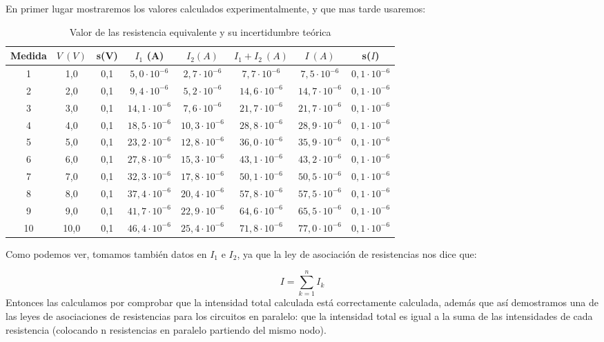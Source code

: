 \documentclass[10pt,a4paper]{article}
\begin{document}
En primer lugar mostraremos los valores calculados experimentalmente, y que mas tarde usaremos:
\begin{table}[h] %
\begin{center}
\begin{tabular}{| c | c | c | c | c | c | c | c |}
\hline
Medida & $V \ (V)$ & s(V) & $I_1 $ (A) & $I_2 (A)$ & $I_1 + I_2 \ (A)$ & $ I \ (A)$ & s($I$) \\ \hline
1 & 1,0 & 0,1 & $5,0 \cdot 10^{-6}$ & $2,7 \cdot 10^{-6}$ & $ 7,7 \cdot 10^{-6}$ & $7,5 \cdot 10^{-6} $
& $0,1\cdot 10^{-6}$\\
2 & 2,0 & 0,1 & $9,4 \cdot 10^{-6}$ & $5,2 \cdot 10^{-6}$ & $ 14,6\cdot 10^{-6}$ & $ 14,7 \cdot 10^{-6} $ & 0$,1\cdot 10^{-6}$\\
3 & 3,0 & 0,1 & $14,1 \cdot 10^{-6}$ & $7,6 \cdot 10^{-6}$ & $ 21,7 \cdot 10^{-6}$ & $21,7 \cdot 10^{-6}$ & $0,1 \cdot 10^{-6}$\\
4 & 4,0 & 0,1 & $18,5 \cdot 10^{-6}$ & $10,3 \cdot 10^{-6}$ & $ 28,8 \cdot 10^{-6}$ & $28,9\cdot 10^{-6}$ & $0,1\cdot 10^{-6}$\\
5 & 5,0 & 0,1 & $23,2 \cdot 10^{-6}$ & $12,8 \cdot 10^{-6}$ & $ 36,0 \cdot 10^{-6}$ & $35,9\cdot 10^{-6}$ & $0,1\cdot 10^{-6}$\\
6 & 6,0 & 0,1 & $27,8 \cdot 10^{-6}$ & $15,3 \cdot 10^{-6}$ & $ 43,1 \cdot 10^{-6}$ & $43,2\cdot 10^{-6}$ & $0,1\cdot 10^{-6}$\\
7 & 7,0 & 0,1 & $32,3 \cdot 10^{-6}$ & $17,8 \cdot 10^{-6}$ & $ 50,1 \cdot 10^{-6}$ & $50,5\cdot 10^{-6}$ & $0,1\cdot 10^{-6}$\\
8 & 8,0 & 0,1 & $37,4 \cdot 10^{-6}$ & $20,4 \cdot 10^{-6}$ & $ 57,8 \cdot 10^{-6} $ & $57,5\cdot 10^{-6}$ & $0,1\cdot 10^{-6}$\\
9 & 9,0 & 0,1 & $41,7 \cdot 10^{-6}$ & $22,9 \cdot 10^{-6}$ & $ 64,6 \cdot 10^{-6}$ & $65,5\cdot 10^{-6}$ & $0,1\cdot 10^{-6}$\\
10 & 10,0 & 0,1 & $46,4 \cdot 10^{-6}$ & $25,4\cdot 10^{-6}$ & $ 71,8 \cdot 10^{-6}$ & $77,0\cdot 10^{-6}$ & $0,1\cdot 10^{-6}$\\ \hline
\end{tabular}
\caption{ Valor de las resistencia equivalente y su incertidumbre teórica}
\end{center}
\end{table}
\begin{flushleft}
Como podemos ver, tomamos también datos en $I_1$ e $I_2$, ya que la ley de asociación de resistencias nos dice que:
\end{flushleft}
\begin{equation}
I = \sum_{k=1}^n I_k \label{Intensidades paralelo}
\end{equation}
Entonces las calculamos por comprobar que la intensidad total calculada está correctamente calculada, además que así demostramos una de las leyes de asociaciones de resistencias para los circuitos en paralelo: que la intensidad total es igual a la suma de las intensidades de cada resistencia (colocando n resistencias en paralelo partiendo del mismo nodo).\\
\end{document}

